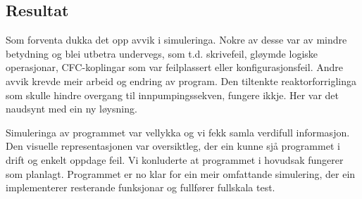 \newpage

\subsection{Resultat}

Som forventa dukka det opp avvik i simuleringa.
Nokre av desse var av mindre betydning og blei utbetra undervegs, som t.d. skrivefeil, gløymde logiske operasjonar,
\gls{CFC}-koplingar som var feilplassert eller konfigurasjonsfeil. \newline
Andre avvik krevde meir arbeid og endring av program.
Den tiltenkte reaktorforriglinga som skulle hindre overgang til innpumpingssekven, fungere ikkje.
Her var det naudsynt med ein ny løysning.

Simuleringa av programmet var vellykka og vi fekk samla verdifull informasjon. 
Den visuelle representasjonen var oversiktleg, der ein kunne sjå programmet i drift og enkelt oppdage feil. \newline
Vi konluderte at programmet i hovudsak fungerer som planlagt.
Programmet er no klar for ein meir omfattande simulering, der ein implementerer resterande funksjonar og fullfører fullskala test.






